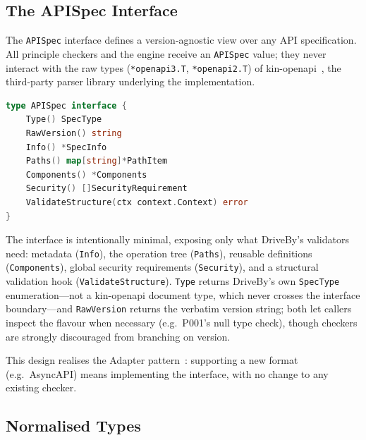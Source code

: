 \subsection{The APISpec Interface}
\label{subsec:apispec-interface}

The \texttt{APISpec} interface defines a version-agnostic view over any API specification. All principle checkers and the engine receive an \texttt{APISpec} value; they never interact with the raw types (\texttt{*openapi3.T}, \texttt{*openapi2.T}) of kin-openapi~\cite{kin-openapi}, the third-party parser library underlying the implementation.

\begin{lstlisting}[language=Go,caption={The APISpec interface (\texttt{spec/spec.go}).},label={lst:apispec}]
type APISpec interface {
    Type() SpecType
    RawVersion() string
    Info() *SpecInfo
    Paths() map[string]*PathItem
    Components() *Components
    Security() []SecurityRequirement
    ValidateStructure(ctx context.Context) error
}
\end{lstlisting}

The interface is intentionally minimal, exposing only what DriveBy's validators need: metadata (\texttt{Info}), the operation tree (\texttt{Paths}), reusable definitions (\texttt{Components}), global security requirements (\texttt{Security}), and a structural validation hook (\texttt{ValidateStructure}). \texttt{Type} returns DriveBy's own \texttt{SpecType} enumeration---not a kin-openapi document type, which never crosses the interface boundary---and \texttt{RawVersion} returns the verbatim version string; both let callers inspect the flavour when necessary (e.g.\ P001's null type check), though checkers are strongly discouraged from branching on version.

This design realises the Adapter pattern~\cite{gof}: supporting a new format (e.g.\ AsyncAPI) means implementing the interface, with no change to any existing checker.

\subsection{Normalised Types}
\label{subsec:normalized-types}

